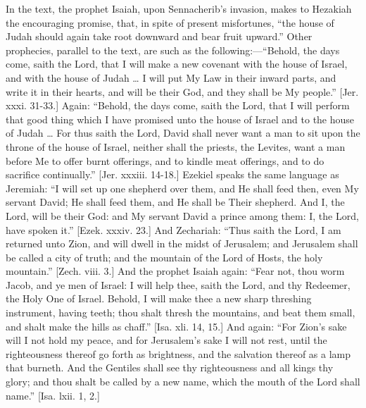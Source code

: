 In the text, the prophet Isaiah, upon Sennacherib's invasion, makes
to Hezakiah the encouraging promise, that, in spite of present
misfortunes, ``the house of Judah should again take root downward
and bear fruit upward.'' Other prophecies, parallel to the text,
are such as the following:—``Behold, the days come, saith the
Lord, that I will make a new covenant with the house of Israel, and
with the house of Judah … I will put My Law in their inward parts,
and write it in their hearts, and will be their God, and they shall be
My people.'' [Jer. xxxi. 31-33.] Again: ``Behold, the days
come, saith the Lord, that I will perform that good thing which I have
promised unto the house of Israel and to the house of Judah … For
thus saith the Lord, David shall never want a man to sit upon the
throne of the house of Israel, neither shall the priests, the Levites,
want a man before Me to offer burnt offerings, and to kindle meat
offerings, and to do sacrifice continually.'' [Jer. xxxiii.
14-18.] Ezekiel speaks the same language as Jeremiah: ``I will set
up one shepherd over them, and He shall feed then, even My servant
David; He shall feed them, and He shall be Their shepherd. And I, the
Lord, will be their God: and My servant David a prince among them: I,
the Lord, have spoken it.'' [Ezek. xxxiv. 23.] And Zechariah:
``Thus
saith the Lord, I am returned unto Zion, and will dwell in the midst
of Jerusalem; and Jerusalem shall be called a city of truth; and the
mountain of the Lord of Hosts, the holy mountain.'' [Zech. viii.
3.] And the prophet Isaiah again: ``Fear not, thou worm Jacob, and
ye men of Israel: I will help thee, saith the Lord, and thy Redeemer,
the Holy One of Israel. Behold, I will make thee a new sharp threshing
instrument, having teeth; thou shalt thresh the mountains, and beat
them small, and shalt make the hills as chaff.'' [Isa. xli. 14,
15.] And again: ``For Zion's sake will I not hold my peace, and
for Jerusalem's sake I will not rest, until the righteousness thereof
go forth as brightness, and the salvation thereof as a lamp that
burneth. And the Gentiles shall see thy righteousness and all kings
thy glory; and thou shalt be called by a new name, which the mouth of
the Lord shall name.'' [Isa. lxii. 1, 2.]

